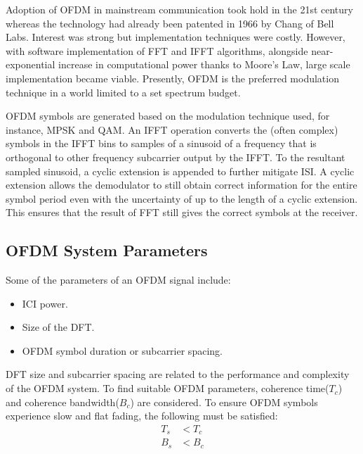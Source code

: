 Adoption of \gls{OFDM} in mainstream communication took hold in the 21st century whereas the technology had already been patented in 1966 by Chang of Bell Labs\cite{history_ofdm}. Interest was strong but implementation techniques were costly. However, with software implementation of \gls{FFT} and \gls{IFFT} algorithms, alongside near-exponential increase in computational power thanks to Moore's Law, large scale implementation became viable. Presently, \gls{OFDM} is the preferred modulation technique in a world limited to a set spectrum budget.

\gls{OFDM} \gls{symbol}s are generated based on the modulation technique used, for instance, \gls{MPSK} and \gls{QAM}. An \gls{IFFT} operation converts the (often complex) symbols in the \gls{IFFT} bins to samples of a sinusoid of a frequency that is orthogonal to other frequency \gls{subcarrier} output by the \gls{IFFT}. To the resultant sampled sinusoid, a cyclic extension is appended to further mitigate \gls{ISI}. A cyclic extension allows the demodulator to still obtain correct information for the entire symbol period even with the uncertainty of up to the length of a cyclic extension. This ensures that the result of \gls{FFT} still gives the correct symbols at the receiver.

\subsection{\gls{OFDM} System Parameters}
Some of the parameters of an \gls{OFDM} signal include:
\begin{itemize}
	\item \gls{ICI} power.
	\item Size of the \gls{DFT}.
	\item \gls{OFDM} symbol duration or \gls{subcarrier} spacing.
\end{itemize}
\gls{DFT} size and \gls{subcarrier} spacing are related to the performance and complexity of the \gls{OFDM} system\cite{wireless_design}. To find suitable \gls{OFDM} parameters, coherence time($T_c$) and coherence bandwidth($B_c$) are considered. To ensure \gls{OFDM} symbols experience slow and flat fading, the following must be satisfied:
\begin{align*}
T_s &< T_c\\
B_s &< B_c
\end{align*}

